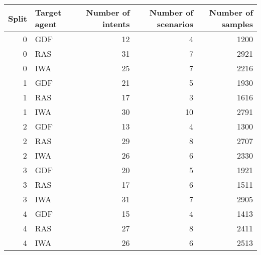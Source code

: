 \begin{tabular}{rlrrr}
\toprule
 Split & Target agent &  Number of intents &  Number of scenarios &  Number of samples \\
\midrule
     0 &          GDF &                 12 &                    4 &               1200 \\
     0 &          RAS &                 31 &                    7 &               2921 \\
     0 &          IWA &                 25 &                    7 &               2216 \\
     1 &          GDF &                 21 &                    5 &               1930 \\
     1 &          RAS &                 17 &                    3 &               1616 \\
     1 &          IWA &                 30 &                   10 &               2791 \\
     2 &          GDF &                 13 &                    4 &               1300 \\
     2 &          RAS &                 29 &                    8 &               2707 \\
     2 &          IWA &                 26 &                    6 &               2330 \\
     3 &          GDF &                 20 &                    5 &               1921 \\
     3 &          RAS &                 17 &                    6 &               1511 \\
     3 &          IWA &                 31 &                    7 &               2905 \\
     4 &          GDF &                 15 &                    4 &               1413 \\
     4 &          RAS &                 27 &                    8 &               2411 \\
     4 &          IWA &                 26 &                    6 &               2513 \\
\bottomrule
\end{tabular}
